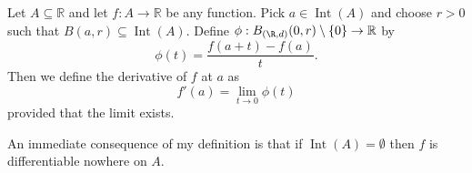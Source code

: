 	
	\begin{definition}
		Let $A \subseteq \mathbb{R}$ and let $f : A \to \mathbb{R}$ be any function. Pick $a \in \operatorname{Int}(A)$ and choose $r > 0$ such that $B(a, r) \subseteq \operatorname{Int}(A)$. Define $\phi : B_{(\R, d)}(0, r) \setminus \{0\} \to \mathbb{R}$ by $$\phi(t) = \frac{f(a+t) - f(a)}{t}.$$ Then we define the derivative of $f$ at $a$ as $$f'(a) = \lim_{t \to 0} \phi(t)$$ provided that the limit exists.
	\end{definition}
	
	\begin{point}
	An immediate consequence of my definition is that if $\operatorname{Int}(A) = \emptyset$ then $f$ is differentiable nowhere on $A$.
\end{point}
	
	\todog{}
